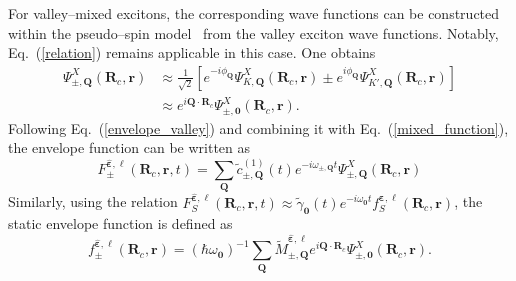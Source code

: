 For valley--mixed excitons, the corresponding wave functions can be constructed within the pseudo--spin model~\cite{peng2022tailoring} from the valley exciton wave functions. Notably, Eq.~(\ref{relation}) remains applicable in this case. One obtains
\begin{equation}
\begin{aligned}
\Psi^{X}_{\pm,\boldsymbol{Q}}(\boldsymbol{R}_c,\boldsymbol{r})
&\approx
\frac{1}{\sqrt{2}}
\left[
e^{-i\phi_{\boldsymbol{Q}}}
\Psi^{X}_{K,\boldsymbol{Q}}(\boldsymbol{R}_c,\boldsymbol{r})
\pm
e^{i\phi_{\boldsymbol{Q}}}
\Psi^{X}_{K',\boldsymbol{Q}}(\boldsymbol{R}_c,\boldsymbol{r})
\right] \\
&\approx
e^{i\boldsymbol{Q}\cdot\boldsymbol{R}_c}
\Psi^{X}_{\pm,\boldsymbol{0}}(\boldsymbol{R}_c,\boldsymbol{r}).
\end{aligned}
\label{mixed_function}
\end{equation}
Following Eq.~(\ref{envelope_valley}) and combining it with Eq.~(\ref{mixed_function}), the envelope function can be written as
\begin{equation}
F_{\pm}^{\hat{\boldsymbol{\varepsilon}}, \ell}(\boldsymbol{R}_c, \boldsymbol{r}, t)
=
\sum_{\boldsymbol{Q}}
\tilde{c}^{(1)}_{\pm,\boldsymbol{Q}}(t)
e^{-i\omega_{\pm,\boldsymbol{Q}} t}
\Psi^{X}_{\pm,\boldsymbol{Q}}(\boldsymbol{R}_c,\boldsymbol{r}) 
\label{envelope_mixed}
\end{equation}
Similarly, using the relation 
$F_{S}^{\hat{\boldsymbol{\varepsilon}}, \ell}(\boldsymbol{R}_c, \boldsymbol{r}, t)
\approx \tilde{\gamma}_{\boldsymbol{0}}(t) e^{-i\omega_{\boldsymbol{0}} t}
f_{S}^{\hat{\boldsymbol{\varepsilon}}, \ell}(\boldsymbol{R}_c, \boldsymbol{r})$,
the static envelope function is defined as
\begin{equation}
f_{\pm}^{\hat{\boldsymbol{\varepsilon}}, \ell}(\boldsymbol{R}_c, \boldsymbol{r})
=
\left(\hbar \omega_{\boldsymbol{0}}\right)^{-1}
\sum_{\boldsymbol{Q}}
\tilde{M}^{\hat{\boldsymbol{\varepsilon}}, \ell}_{\pm,\boldsymbol{Q}}
e^{i\boldsymbol{Q}\cdot\boldsymbol{R}_c}
\Psi^{X}_{\pm,\boldsymbol{0}}(\boldsymbol{R}_c,\boldsymbol{r}).
\end{equation}

